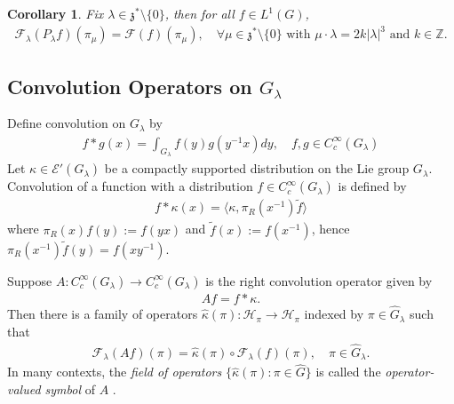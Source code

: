 \documentclass[11pt]{amsart}
\theoremstyle{plain}
\newtheorem{corollary}[theorem]{Corollary}
\theoremstyle{definition}
\theoremstyle{remark}
\numberwithin{equation}{section}
\def\fz{\mathfrak{z}}
\def\cE{\mathcal{E}}
\def\cH{\mathcal{H}}
\def\cF{\mathcal{F}}
\numberwithin{equation}{section}
\begin{document}
\begin{corollary}
	Fix $\lambda\in \mathfrak{z}^*\setminus\{0\}$, then for all $f\in L^1(G)$,
	\begin{align*}
		\mathcal{F}_\lambda\left(P_\lambda f\right)(\pi_\mu)
		=\mathcal{F}(f)(\pi_\mu), 
		\quad  \forall \mu\in \fz^*\setminus\{0\}  \text{ with }\mu\cdot \lambda=2k|\lambda|^3 \text{ and } k\in \mathbb{Z}.
	\end{align*}
\end{corollary}


\subsection{Convolution Operators on $G_\lambda$}
Define convolution	 on $G_\lambda$  by
\begin{align*}
	f*g(x)=\int_{G_\lambda}f(y)g(y^{-1}x)dy, \quad f, g\in C_c^\infty(G_\lambda)
\end{align*}
Let $\kappa\in \cE'(G_\lambda)$ be a compactly supported distribution on the Lie group $G_\lambda$.  Convolution of a function with a distribution $f\in C_c^\infty(G_\lambda)$ is defined by 
\begin{align*}
	f*\kappa (x)=\langle \kappa, \pi_R(x^{-1})\widetilde{f}\rangle
\end{align*}
where $\pi_R(x)f(y):=f(yx)$ and $\widetilde{f}(x):=f(x^{-1})$, hence $\pi_R(x^{-1})\widetilde{f}(y)=f(xy^{-1})$. 


Suppose $A: C_c^\infty (G_\lambda)\to C_c^\infty(G_\lambda)$ is the right  convolution operator given by
\begin{align*}
	Af=f*\kappa.
\end{align*}
Then there is a family of  operators $\hat\kappa(\pi): \cH_\pi\to \cH_\pi$ indexed by $\pi\in \widehat{G}_\lambda$ such that
\begin{align*}
	\cF_\lambda(Af)(\pi)=\hat{\kappa}(\pi)\circ\cF_\lambda(f)(\pi), \quad \pi \in \widehat{G}_\lambda.
\end{align*}
In many contexts, the \textit{field of operators} $\{\hat{\kappa}(\pi): \pi\in \widehat{G}\}$ is called the \textit{operator-valued symbol} of $A$ \cite{fischerQuantizationNilpotentLie2016}.
\end{document}
